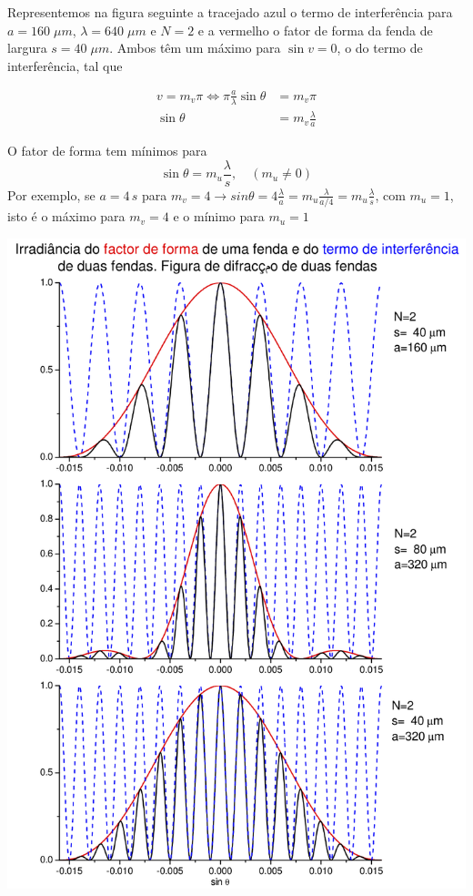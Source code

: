 \documentclass[a4paper,12pt]{article}
\begin{document}
Representemos na figura seguinte a tracejado azul o termo de interferência para $a=160\; \mu m$, 
$\lambda=640\; \mu m$ e $N=2$ e  a vermelho o fator de forma da fenda de largura  $s=40\; \mu m$.
Ambos têm um máximo para $\sin v=0$, o do termo de interferência,   tal que 

\begin{align}\label{eq:49}
	v= m_v \pi \Leftrightarrow  \pi \frac{ a}{\lambda} \sin \theta  &= m_v \pi  \nonumber \\
	 \sin \theta  &= m_v  \frac{\lambda}{ a}
\end{align}

O fator de forma   tem mínimos  para  
\begin{equation}
	 \sin \theta  = m_u  \frac{\lambda}{s}, \quad (m_u \ne 0)
\end{equation}
Por exemplo, se $a=4\, s$ para $m_v=4 \to sin \theta  = 4 \frac{\lambda}{a} = m_u \frac{\lambda}{a/4} = m_u \frac{\lambda}{s} $, com $ m_u=1$, 
isto é o máximo para $m_v= 4$ e o mínimo para $m_u=1$ 


\begin{center}
\includegraphics{./figura7}\label{fig:7} \\[1cm]  %
\end{center}
\end{document}
